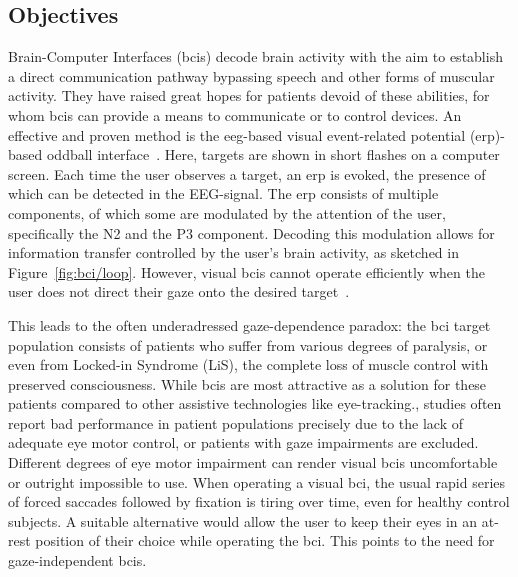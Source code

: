 \subsection{Objectives}

Brain-Computer Interfaces (\ac{bci}s) decode brain activity with the aim to establish a direct communication
pathway bypassing speech and other forms of muscular activity. They have raised great hopes for patients
devoid of these abilities, for whom \ac{bci}s can provide a means to communicate or to
control devices.
An effective and proven method is the \ac{eeg}-based visual event-related potential (\ac{erp})-based
oddball interface~\cite{Wolpaw2018,Severens2020}.
Here, targets are shown in short flashes on a computer screen.
Each time the user observes a target, an \ac{erp} is evoked, the presence of which can be
detected in the EEG-signal.
The \ac{erp} consists of multiple components, of which some are modulated by the
attention of the user, specifically the N2 and the P3 component.
Decoding this modulation allows for information transfer controlled by the
user's brain activity, as sketched in Figure~\ref{fig:bci/loop}.
However, visual \ac{bci}s cannot operate efficiently when the user does not direct
their gaze onto the desired target~\cite{Brunner2010, Frenzel2011}.

This leads to the often underadressed gaze-dependence paradox: the \ac{bci} target
population consists of patients who suffer from various degrees
of paralysis, or even from Locked-in Syndrome (LiS), the complete loss of muscle
control with preserved consciousness.
While \ac{bci}s are most attractive as a solution for these patients
compared to other assistive technologies like eye-tracking., studies often
report bad performance in patient populations precisely due to the lack of adequate eye motor
control, or patients with gaze impairments are excluded.
Different degrees of eye motor impairment can render visual \ac{bci}s
uncomfortable or outright impossible to use.
When operating a visual \ac{bci}, the usual rapid series of forced saccades followed
by fixation is tiring over time, even for healthy control subjects.
A suitable alternative would allow the user to keep their eyes in an at-rest
position of their choice while operating the \ac{bci}.
This points to the need for gaze-independent \ac{bci}s.

